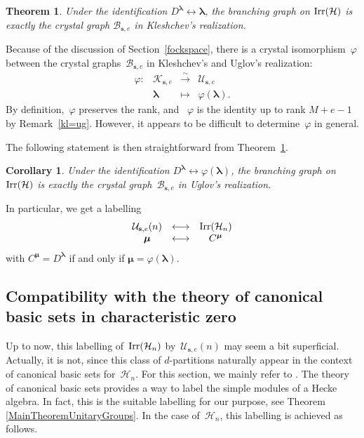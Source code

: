 \documentclass[twoside,12pt]{amsart}
\theoremstyle{plain}
\newtheorem{thm}[num]{Theorem}
\newtheorem{cor}[num]{Corollary}
\begin{document}
\begin{thm}\label{thmbranchingAKkl}
{\rm \cite[Theorem 6.1]{Ariki2007}}
Under the identification $D^{\boldsymbol{\lambda}}\leftrightarrow{\boldsymbol{\lambda}}$, the branching graph 
on ${\text{\rm Irr}}({\mathcal{H}})$ is exactly the crystal graph ${\mathcal{B}}_{{\mathbf{s}},e}$ in Kleshchev's 
realization.
\end{thm}

Because of the discussion of Section~\ref{fockspace}, there is a crystal 
isomorphism~$\varphi$ between the crystal graphs~${\mathcal{B}}_{{\mathbf{s}},e}$ in Kleshchev's 
and Uglov's realization:
$$
\begin{array}{cccc}
\varphi : & {\mathcal{K}}_{{\mathbf{s}},e} & \overset{\sim}{\longrightarrow} & {\mathcal{U}}_{{\mathbf{s}},e} \\
& {\boldsymbol{\lambda}} & \longmapsto & \varphi({\boldsymbol{\lambda}}).
\end{array}
$$
By definition,~$\varphi$ preserves the rank, and ~$\varphi$ is the identity up 
to rank $M+e-1$ by Remark~\ref{kl=ug}. However, it appears to be difficult to 
determine~$\varphi$ in general.

The following statement is then straightforward from 
Theorem~\ref{thmbranchingAKkl}.

\begin{cor}\label{corbranchingAKug}
Under the identification $D^{\boldsymbol{\lambda}}\leftrightarrow\varphi({\boldsymbol{\lambda}})$, the 
branching graph on~${\text{\rm Irr}}({\mathcal{H}})$ is exactly the crystal graph~${\mathcal{B}}_{{\mathbf{s}},e}$ in 
Uglov's realization.
\end{cor}

In particular, we get a labelling 
$$\begin{array}{ccc}
{\mathcal{U}}_{{\mathbf{s}},e}(n) & \longleftrightarrow & {\text{\rm Irr}}({\mathcal{H}}_n) \\
{\boldsymbol{\mu}} & \longleftrightarrow & C^{\boldsymbol{\mu}}
\end{array}
$$
with $C^{\boldsymbol{\mu}}=D^{\boldsymbol{\lambda}}$ if and only if ${\boldsymbol{\mu}}=\varphi({\boldsymbol{\lambda}})$.

\subsection{Compatibility with the theory of canonical basic sets in 
characteristic zero}
\label{uglov}

Up to now, this labelling of~${\text{\rm Irr}}({\mathcal{H}}_n)$ by~${\mathcal{U}}_{{\mathbf{s}},e}(n)$ may seem a bit 
superficial. Actually, it is not, since this class of $d$-partitions naturally 
appear in the context of canonical basic sets for~${\mathcal{H}}_n$. For this section, 
we mainly refer to \cite[Chapter 6]{GeckJacon2011}. The theory of canonical 
basic sets provides a way to label the simple modules of a Hecke algebra. 
In fact, this is the suitable labelling for our purpose, see 
Theorem \ref{MainTheoremUnitaryGroups}. 
In the case of~${\mathcal{H}}_n$, this labelling is achieved as follows.  
\end{document}
